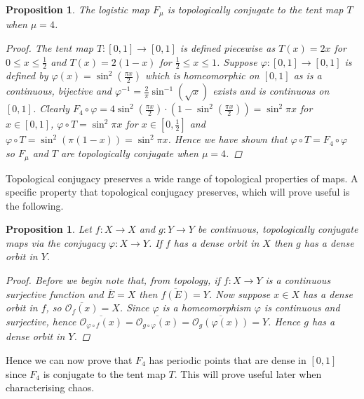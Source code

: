 \documentclass[11pt,a4paper,oneside]{memoir}
\theoremstyle{plain}
\newtheorem{prop}[thm]{Proposition}
\theoremstyle{definition}
\begin{document}
\begin{prop} \label{prop:tent-logistic}
    The logistic map $F_\mu$ is topologically conjugate to the tent map $T$ when $\mu = 4$.
    \begin{proof}
    The tent map $T: [0, 1] \to [0,1]$ is defined piecewise as $T(x) = 2x$ for $0 \leq x \leq \frac{1}{2}$ and $T(x) = 2(1-x)$ for $\frac{1}{2} \leq x \leq 1$. Suppose $\varphi: [0, 1] \to [0,1]$ is defined by $\varphi(x) = \sin^2(\frac{\pi x}{2})$ which is homeomorphic on $[0, 1]$ as is a continuous, bijective and $\varphi^{-1} = \frac{2}{\pi} \sin^{-1}(\sqrt{x})$ exists and is continuous on $[0, 1]$. Clearly $F_4 \circ \varphi = 4 \sin^2\left(\frac{\pi x}{2}\right) \cdot \left(1 - \sin^2\left(\frac{\pi x}{2}\right)\right) = \sin^2\pi x$ for $x \in [0, 1]$, $\varphi \circ T = \sin^2\pi x$ for $x \in [0, \frac{1}{2}]$ and $\varphi \circ T = \sin^2 (\pi (1-x)) = \sin^2 \pi x$. Hence we have shown that $\varphi \circ T = F_4 \circ \varphi$ so $F_\mu$ and $T$ are topologically conjugate when $\mu = 4$.
    \end{proof}
\end{prop}

Topological conjugacy preserves a wide range of topological properties of maps. A specific property that topological conjugacy preserves, which will prove useful is the following.

\begin{prop}
    Let $f: X \to X$ and $g: Y \to Y$ be continuous, topologically conjugate maps via the conjugacy $\varphi: X \to Y$. If $f$ has a dense orbit in $X$ then $g$ has a dense orbit in $Y$.
    \begin{proof}
        Before we begin note that, from topology, if $f: X \to Y$ is a continuous surjective function and $\overline{E} = X$ then $\overline{f(E)} = Y$. Now suppose $x \in X$ has a dense orbit in $f$, so $\overline{\mathcal{O}_f(x)} = X$. Since $\varphi$ is a homeomorphism $\varphi$ is continuous and surjective, hence $\overline{\mathcal{O}_{\varphi \circ f}(x)} = \overline{\mathcal{O}_{g \circ \varphi}(x)} = \overline{\mathcal{O}_{g}(\varphi(x))} = Y$. Hence $g$ has a dense orbit in $Y$.
    \end{proof}
\end{prop}

Hence we can now prove that $F_4$ has periodic points that are dense in $[0, 1]$ since $F_4$ is conjugate to the tent map $T$. This will prove useful later when characterising chaos.
\end{document}
